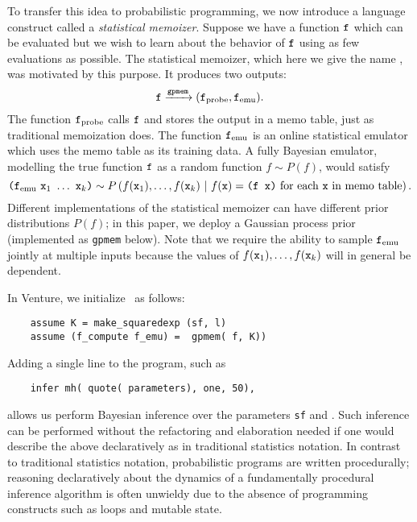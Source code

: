 To transfer this idea to probabilistic programming, we now introduce a language construct called a
\emph{statistical memoizer}.  Suppose we have a function $\texttt{f}$ which can be evaluated 
but we wish to learn about the behavior of $\texttt{f}$ using as
few evaluations as possible.  The statistical memoizer, which here we give the
name \gpmem, was motivated by this purpose.  It produces two outputs:
\[ \texttt{f} \xrightarrow{\texttt{gpmem}} (\texttt{f}_{\textrm{probe}}, \texttt{f}_{\textrm{emu}}). \]
The function $\texttt{f}_{\textrm{probe}}$ calls $\texttt{f}$ and stores the output in a memo
table, just as traditional memoization does.  The function $\texttt{f}_{\textrm{emu}}$ is
an online statistical emulator which uses the memo table as its training
data.  A fully Bayesian emulator, modelling the true function $\texttt{f}$ as a
random function $f \sim P(f)$, would satisfy
\[
\texttt{(}\ftt_\emu\ \xtt_1\ \ldots\ \xtt_k\texttt{)}
\sim
P\pn{
  f(\xtt_1), \ldots, f(\xtt_k)
  \mvert
  \text{$f(\xtt) = \texttt{(f x)}$ for each $\xtt$ in memo table}
}.
\]
Different implementations of the statistical memoizer can have
different prior distributions $P(f)$; in this paper, we deploy a Gaussian process
prior (implemented as \texttt{gpmem} below).  Note that we require the ability
to sample $\texttt{f}_{\textrm{emu}}$ jointly at multiple inputs because the values of
$f(\texttt{x}_1),\ldots,f(\texttt{x}_k)$ will in general be dependent.

In Venture, we initialize \gpmem\ as follows:

    \begin{lstlisting}
    assume K = make_squaredexp (sf, l)
    assume (f_compute f_emu) =  gpmem( f, K))
    \end{lstlisting}



Adding a single line to the program, such as
    \begin{lstlisting}
    infer mh( quote( parameters), one, 50),
    \end{lstlisting}
allows us perform Bayesian inference over the parameters \texttt{sf} and . 
Such inference can be performed without the refactoring and elaboration needed if one
would describe the above declaratively as in traditional statistics notation. 
In contrast to traditional statistics notation, probabilistic programs are written
procedurally; reasoning declaratively about the dynamics of a fundamentally procedural inference
algorithm is often unwieldy due to the absence of programming constructs
such as loops and mutable state.


